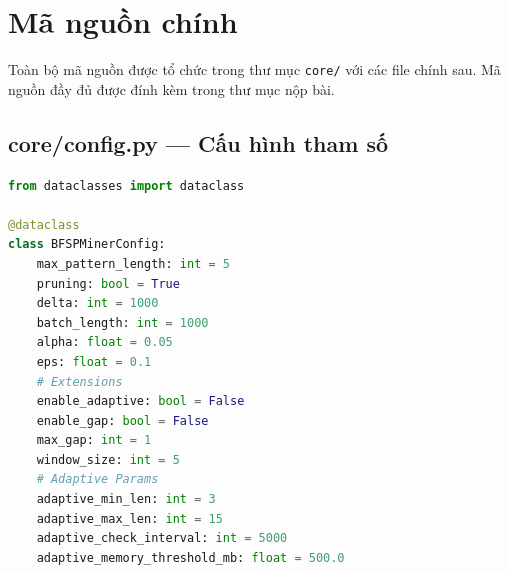 \documentclass[a4paper,12pt]{report}
\begin{document}



\appendix
\chapter{Mã nguồn chính}
\label{app:code}

Toàn bộ mã nguồn được tổ chức trong thư mục \texttt{core/} với các file chính sau. Mã nguồn đầy đủ được đính kèm trong thư mục nộp bài.

\section{core/config.py --- Cấu hình tham số}
\begin{lstlisting}[language=Python, caption={Cau hinh BFSPMiner}]
from dataclasses import dataclass

@dataclass
class BFSPMinerConfig:
    max_pattern_length: int = 5
    pruning: bool = True
    delta: int = 1000
    batch_length: int = 1000
    alpha: float = 0.05
    eps: float = 0.1
    # Extensions
    enable_adaptive: bool = False
    enable_gap: bool = False
    max_gap: int = 1
    window_size: int = 5
    # Adaptive Params
    adaptive_min_len: int = 3
    adaptive_max_len: int = 15
    adaptive_check_interval: int = 5000
    adaptive_memory_threshold_mb: float = 500.0
\end{lstlisting}
\end{document}

